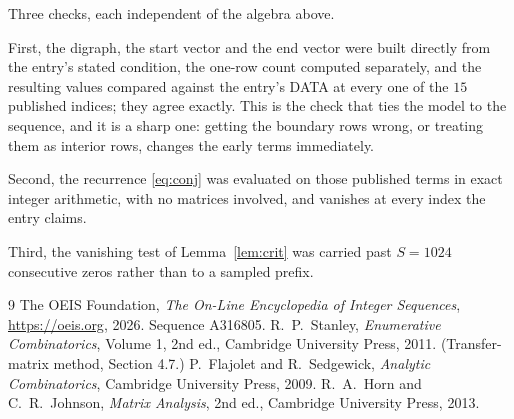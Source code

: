\documentclass[11pt,a4paper]{article}
\theoremstyle{plain}
\theoremstyle{definition}
\begin{document}
Three checks, each independent of the algebra above.

First, the digraph, the start vector and the end vector were built directly from the
entry's stated condition, the one-row count computed separately, and the resulting values
compared against the entry's DATA at every one of the $15$ published indices; they
agree exactly. This is the check that ties the model to the sequence, and it is a sharp one:
getting the boundary rows wrong, or treating them as interior rows, changes the early terms
immediately.

Second, the recurrence \eqref{eq:conj} was evaluated on those published terms in exact
integer arithmetic, with no matrices involved, and vanishes at every index the entry claims.

Third, the vanishing test of Lemma~\ref{lem:crit} was carried past $S=1024$ consecutive
zeros rather than to a sampled prefix.

\begin{thebibliography}{9}
 The OEIS Foundation, \emph{The On-Line Encyclopedia of Integer
Sequences}, \url{https://oeis.org}, 2026. Sequence A316805.
 R.~P.~Stanley, \emph{Enumerative Combinatorics}, Volume 1, 2nd ed.,
Cambridge University Press, 2011. (Transfer-matrix method, Section 4.7.)
 P.~Flajolet and R.~Sedgewick, \emph{Analytic Combinatorics}, Cambridge
University Press, 2009.
 R.~A.~Horn and C.~R.~Johnson, \emph{Matrix Analysis}, 2nd ed., Cambridge
University Press, 2013.
\end{thebibliography}
\end{document}
